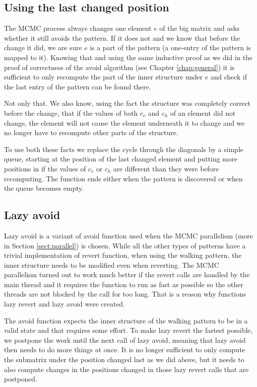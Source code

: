 \subsection{Using the last changed position}
The MCMC process always changes one element $e$ of the big matrix and asks whether it still avoids the pattern. If it does not and we know that before the change it did, we are sure $e$ is a part of the pattern (a one-entry of the pattern is mapped to it). Knowing that and using the same inductive proof as we did in the proof of correctness of the avoid algorithm (see Chapter \ref{chap:general}) it is sufficient to only recompute the part of the inner structure under $e$ and check if the last entry of the pattern can be found there.

Not only that. We also know, using the fact the structure was completely correct before the change, that if the values of both $c_v$ and $c_h$ of an element did not change, the element will not cause the element underneath it to change and we no longer have to recompute other parts of the structure.

To use both these facts we replace the cycle through the diagonals by a simple queue, starting at the position of the last changed element and putting more positions in if the values of $c_v$ or $c_h$ are different than they were before recomputing. The function ends either when the pattern is discovered or when the queue becomes empty.

\subsection{Lazy avoid}
Lazy avoid is a variant of avoid function used when the MCMC parallelism (more in Section \ref{sect:parallel}) is chosen. While all the other types of patterns have a trivial implementation of revert function, when using the walking pattern, the inner structure needs to be modified even when reverting. The MCMC parallelism turned out to work much better if the revert calls are handled by the main thread and it requires the function to run as fast as possible so the other threads are not blocked by the call for too long. That is a reason why functions lazy revert and lazy avoid were created.

The avoid function expects the inner structure of the walking pattern to be in a valid state and that requires some effort. To make lazy revert the fastest possible, we postpone the work until the next call of lazy avoid, meaning that lazy avoid then needs to do more things at once. It is no longer sufficient to only compute the submatrix under the position changed last as we did above, but it needs to also compute changes in the positions changed in those lazy revert calls that are postponed.

